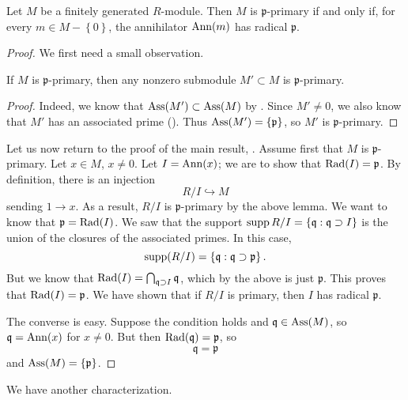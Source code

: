 \begin{proposition} \label{whenisprimary}
Let $M$ be a finitely generated $R$-module. Then $M$ is \textbf{$\mathfrak{p}$}-primary if
and only if, for every $m \in M - \left\{0\right\}$, 
the annihilator $\operatorname{Ann}(m)$ has radical $\mathfrak{p}$.
\end{proposition} 
\begin{proof} 
We first need a small observation.

\begin{lemma} 
If $M$ is $\mathfrak{p}$-primary, then any nonzero submodule $M' \subset M$ is
$\mathfrak{p}$-primary.
\end{lemma} 
\begin{proof} 
Indeed, we know that $\operatorname{Ass}(M') \subset \operatorname{Ass}(M)$ by .
Since $M' \neq 0$, we also know that $M'$ has an associated prime
(). Thus $ \operatorname{Ass}(M') = \{\mathfrak{p}\}$, so
$M'$ is $\mathfrak{p}$-primary.
\end{proof} 

Let us now return to the proof of the main result,
.
Assume first that $M$ is $\mathfrak{p}$-primary. Let $x \in M$, $x \neq 0$. Let
$I = \operatorname{Ann}(x)$; we are to show that $\operatorname{Rad}(I)  =\mathfrak{p}$. By definition, there is an injection
\[ R/I \hookrightarrow M  \]
sending $1 \to x$. As a result, $R/I$ is $\mathfrak{p}$-primary by the above
lemma. We want to know that $\mathfrak{p}  = \operatorname{Rad}(I)$. 
We saw that the support $\operatorname{supp} R/I = \left\{\mathfrak{q}: \mathfrak{q}
\supset I\right\}$ is the union of the closures of the associated primes. In
this case, 
\[ \operatorname{supp}(R/I) = \left\{\mathfrak{q}: \mathfrak{q} \supset \mathfrak{p}\right\}
.\]
But we know that $\operatorname{Rad}(I) = \bigcap_{\mathfrak{q} \supset I} \mathfrak{q}$,
which by the above is just $\mathfrak{p}$. This proves that $\operatorname{Rad}(I) =
\mathfrak{p}$.
We have shown that if $R/I$ is primary, then $I$ has radical $\mathfrak{p}$.

The converse is easy. 
Suppose the condition holds and $\mathfrak{q} \in \operatorname{Ass}(M)$, so $\mathfrak{q} =
\operatorname{Ann}(x)$ for $x \neq 0$. But then $\operatorname{Rad}(\mathfrak{q}) = \mathfrak{p}$, so 
\[ \mathfrak{q} = \mathfrak{p}  \] and $\operatorname{Ass}(M) = \left\{\mathfrak{p}\right\}$.
\end{proof} 

We have another characterization.

